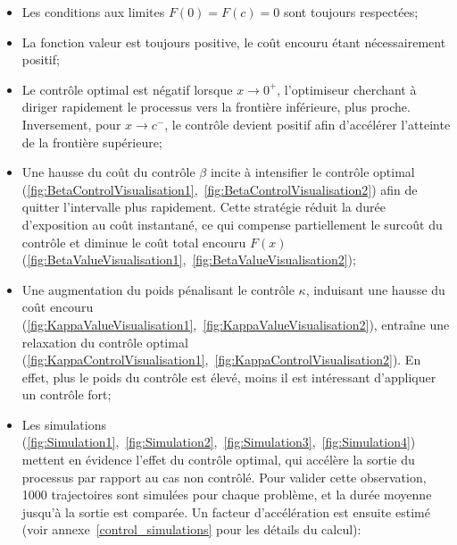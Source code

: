 \begin{itemize}
    \item Les conditions aux limites $F(0)=F(c)=0$ sont toujours respectées;
    \item La fonction valeur est toujours positive, le coût encouru étant nécessairement positif;
    \item Le contrôle optimal est négatif lorsque \( x \to 0^+ \), l'optimiseur cherchant à diriger rapidement le processus vers la frontière inférieure, plus proche. Inversement, pour \( x \to c^-\), le contrôle devient positif afin d'accélérer l'atteinte de la frontière supérieure;
    \item Une hausse du coût du contrôle $\beta$ incite à intensifier le contrôle optimal (\ref{fig:BetaControlVisualisation1},~\ref{fig:BetaControlVisualisation2}) afin de quitter l'intervalle plus rapidement. Cette stratégie réduit la durée d'exposition au coût instantané, ce qui compense partiellement le surcoût du contrôle et diminue le coût total encouru $F(x)$ (\ref{fig:BetaValueVisualisation1},~\ref{fig:BetaValueVisualisation2});
    \item Une augmentation du poids pénalisant le contrôle $\kappa$, induisant une hausse du coût encouru (\ref{fig:KappaValueVisualisation1},~\ref{fig:KappaValueVisualisation2}), entraîne une relaxation du contrôle optimal (\ref{fig:KappaControlVisualisation1},~\ref{fig:KappaControlVisualisation2}). En effet, plus le poids du contrôle est élevé, moins il est intéressant d'appliquer un contrôle fort;
    \item Les simulations (\ref{fig:Simulation1},~\ref{fig:Simulation2},~\ref{fig:Simulation3},~\ref{fig:Simulation4}) mettent en évidence l'effet du contrôle optimal, qui accélère la sortie du processus par rapport au cas non contrôlé. Pour valider cette observation, 1000 trajectoires sont simulées pour chaque problème, et la durée moyenne jusqu'à la sortie est comparée. Un facteur d'accélération est ensuite estimé (voir annexe~\ref{control_simulations} pour les détails du calcul):

\end{itemize}
